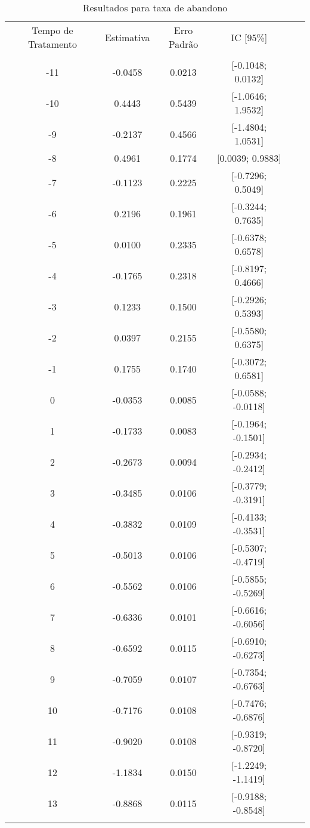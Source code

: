 \documentclass[
        12pt,                           %
        openright,                      %
        oneside,
        a4paper,                        %
        chapter=TITLE,         %
        section=TITLE,         %
        subsection=Title,      %
        english,                        %
        spanish,                        %
        portugues,                      %
        ]{abntex2}
\begin{document}
{\begin{apendicesenv}
\begin{table}[htbp]
\caption{Resultados para taxa de abandono}  
\centering
\begin{tabular}{cccccc}
\\ \hline
Tempo de Tratamento & Estimativa & Erro Padrão & IC [95\%] \\
\\ \hline
-11 & -0.0458 & 0.0213 & [-0.1048; 0.0132] \\
-10 & 0.4443 & 0.5439 & [-1.0646; 1.9532] \\
-9 & -0.2137 & 0.4566 & [-1.4804; 1.0531] \\
-8 & 0.4961 & 0.1774 & [0.0039; 0.9883] \\
-7 & -0.1123 & 0.2225 & [-0.7296; 0.5049] \\
-6 & 0.2196 & 0.1961 & [-0.3244; 0.7635] \\
-5 & 0.0100 & 0.2335 & [-0.6378; 0.6578] \\
-4 & -0.1765 & 0.2318 & [-0.8197; 0.4666] \\
-3 & 0.1233 & 0.1500 & [-0.2926; 0.5393] \\
-2 & 0.0397 & 0.2155 & [-0.5580; 0.6375] \\
-1 & 0.1755 & 0.1740 & [-0.3072; 0.6581] \\
0 & -0.0353 & 0.0085 & [-0.0588; -0.0118] \\
1 & -0.1733 & 0.0083 & [-0.1964; -0.1501] \\
2 & -0.2673 & 0.0094 & [-0.2934; -0.2412] \\
3 & -0.3485 & 0.0106 & [-0.3779; -0.3191] \\
4 & -0.3832 & 0.0109 & [-0.4133; -0.3531] \\
5 & -0.5013 & 0.0106 & [-0.5307; -0.4719] \\
6 & -0.5562 & 0.0106 & [-0.5855; -0.5269] \\
7 & -0.6336 & 0.0101 & [-0.6616; -0.6056] \\
8 & -0.6592 & 0.0115 & [-0.6910; -0.6273] \\
9 & -0.7059 & 0.0107 & [-0.7354; -0.6763] \\
10 & -0.7176 & 0.0108 & [-0.7476; -0.6876] \\
11 & -0.9020 & 0.0108 & [-0.9319; -0.8720] \\
12 & -1.1834 & 0.0150 & [-1.2249; -1.1419] \\
13 & -0.8868 & 0.0115 & [-0.9188; -0.8548] \\
\\ \hline
\end{tabular}
\label{tab:resultados_abandono}
\end{table}


\end{apendicesenv}}
\end{document}

